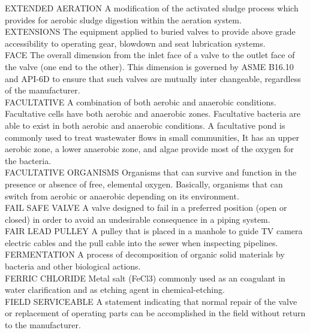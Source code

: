 \documentclass{article}
\begin{document}
EXTENDED AERATION
A modification of the activated sludge process which provides for aerobic sludge digestion within the aeration system.
\vspace{0.3cm}\\
EXTENSIONS
The equipment applied to buried valves to provide above grade accessibility to operating gear, blowdown and seat lubrication systems.
\vspace{0.3cm}\\
FACE
The overall dimension from the inlet face of a valve to the outlet face of the valve (one end to the other). This dimension is governed by ASME B16.10 and API-6D to ensure that such valves are mutually inter changeable, regardless of the manufacturer.
\vspace{0.3cm}\\
FACULTATIVE
A combination of both aerobic and anaerobic conditions. Facultative cells have both aerobic and anaerobic zones. Facultative bacteria are able to exist in both aerobic and anaerobic conditions. A facultative pond is commonly used to treat wastewater flows in small communities, It has an upper aerobic zone, a lower anaerobic zone, and algae provide most of the oxygen for the bacteria.
\vspace{0.3cm}\\
FACULTATIVE ORGANISMS
Organisms that can survive and function in the presence or absence of free, elemental oxygen. Basically, organisms that can switch from aerobic or anaerobic depending on its environment. 
\vspace{0.3cm}\\
FAIL SAFE VALVE
A valve designed to fail in a preferred position (open or closed) in order to avoid an undesirable consequence in a piping system.
\vspace{0.3cm}\\
FAIR LEAD PULLEY
A pulley that is placed in a manhole to guide TV camera electric cables and the pull cable into the sewer when inspecting pipelines. 
\vspace{0.3cm}\\
FERMENTATION
A process of decomposition of organic solid materials by bacteria and other biological actions.
\vspace{0.3cm}\\
FERRIC CHLORIDE
Metal salt (FeCl3) commonly used as an coagulant in water clarification and as etching agent in chemical-etching.
\vspace{0.3cm}\\
FIELD SERVICEABLE
A statement indicating that normal repair of the valve or replacement of operating parts can be accomplished in the field without return to the manufacturer.
\end{document}
